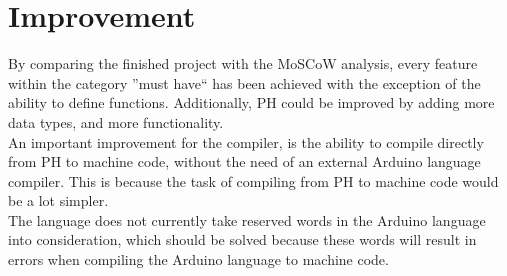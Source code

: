 \section{Improvement}\label{discussion:improvements}
By comparing the finished project with the MoSCoW analysis, every feature within the category ''must have`` has been achieved with the exception of the ability to define functions. Additionally, PH could be improved by adding more data types, and more functionality.\\

An important improvement for the compiler, is the ability to compile directly from PH to machine code, without the need of an external Arduino language compiler. This is because the task of compiling from PH to machine code would be a lot simpler.\\

The language does not currently take reserved words in the Arduino language into consideration, which should be solved because these words will result in errors when compiling the Arduino language to machine code. \\ 
